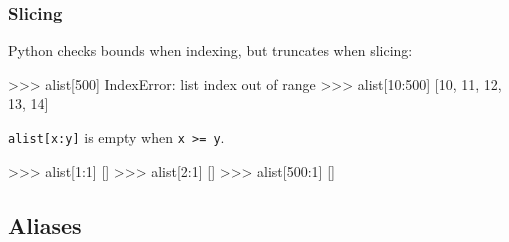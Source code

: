 \documentclass[xetex,10pt]{beamer}
\def\pythoni{\lstinline[language=pythontim]}
\def\spacer{\vspace*{1em}}
\begin{document}
\begin{frame}[fragile]
	\frametitle{Slicing}

Python checks bounds when indexing, but truncates when slicing:

\begin{python}
>>> alist[500]
IndexError: list index out of range
>>> alist[10:500]
[10, 11, 12, 13, 14]
\end{python}

	\spacer

\pause
\pythoni{alist[x:y]} is empty when \pythoni{x >= y}.

\begin{python}
>>> alist[1:1]
[]
>>> alist[2:1]
[]
>>> alist[500:1]
[]
\end{python}

\end{frame}

\subsection{Aliases}
\end{document}
